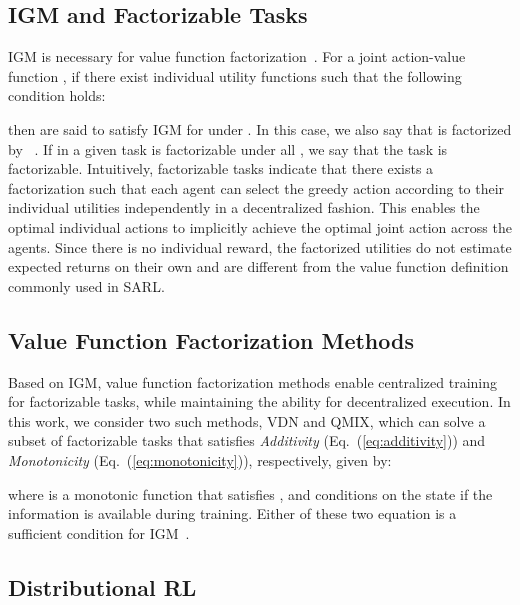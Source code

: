 \documentclass{article}
\newcommand{\additivity}{\textit{Additivity}}
\newcommand{\monotonicity}{\textit{Monotonicity}}
\newcounter{definition}
\begin{document}
\subsection{IGM and Factorizable Tasks}
\label{subsec:background_igm_and_factorizable_task}

IGM is necessary for value function factorization~\cite{Son2019QTRAN}. For a joint action-value function , if there exist  individual utility functions  such that the following condition holds:

then  are said to satisfy IGM for  under . In this case, we also say that  is factorized by ~\cite{Son2019QTRAN}. If  in a given task is factorizable under all , we say that the task is factorizable. Intuitively, factorizable tasks indicate that there exists a factorization such that each agent can select the greedy action according to their individual utilities  independently in a decentralized fashion. This enables the optimal individual actions to implicitly achieve the optimal joint action across the  agents. Since there is no individual reward, the factorized utilities do not estimate expected returns on their own \cite{Guestrin2001Utility} and are different from the value function definition commonly used in SARL.



\subsection{Value Function Factorization Methods}
\label{subsec:background_value_factorization_methods}
Based on IGM, value function factorization methods enable centralized training for factorizable tasks, while maintaining the ability for decentralized execution. In this work, we consider two such methods, VDN and QMIX, which can solve a subset of factorizable tasks that satisfies \additivity{} (Eq.~(\ref{eq:additivity})) and \monotonicity{} (Eq.~(\ref{eq:monotonicity})), respectively, given by:


where  is a monotonic function that satisfies , and conditions on the state  if the information is available during training. Either of these two equation is a sufficient condition for IGM~\cite{Son2019QTRAN}.



\subsection{Distributional RL}
\label{subsec:background_distributional_rl}
\end{document}

